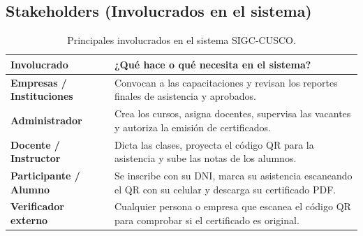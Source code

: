 \subsection{Stakeholders (Involucrados en el sistema)}

\begin{table}[H]
\centering
\small
\begin{tabularx}{\textwidth}{P{3.8cm} Y}
\toprule
\textbf{Involucrado} & \textbf{¿Qué hace o qué necesita en el sistema?} \\
\midrule
\textbf{Empresas / Instituciones} & Convocan a las capacitaciones y revisan los reportes finales de asistencia y aprobados. \\
\addlinespace
\textbf{Administrador} & Crea los cursos, asigna docentes, supervisa las vacantes y autoriza la emisión de certificados. \\
\addlinespace
\textbf{Docente / Instructor} & Dicta las clases, proyecta el código QR para la asistencia y sube las notas de los alumnos. \\
\addlinespace
\textbf{Participante / Alumno} & Se inscribe con su DNI, marca su asistencia escaneando el QR con su celular y descarga su certificado PDF. \\
\addlinespace
\textbf{Verificador externo} & Cualquier persona o empresa que escanea el código QR para comprobar si el certificado es original. \\
\bottomrule
\end{tabularx}
\caption{Principales involucrados en el sistema SIGC-CUSCO.}
\label{tab:stakeholders}
\end{table}
